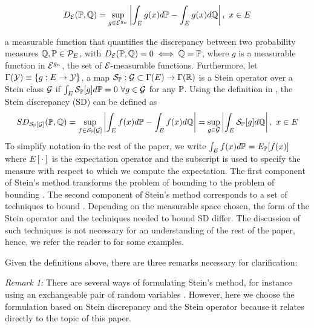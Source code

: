 \begin{equation}\label{IPM}
D_{\mathcal{E}}(\mathbb{P}, \mathbb{Q}) = \sup_{g \in \mathcal{E}^{g_n}}\left|\int_E g(x)d\mathbb{P} - \int_E g(x)d\mathbb{Q}\right|, \ x \in E
\end{equation}

a measurable function that quantifies the discrepancy between two probability measures $\mathbb{Q},\mathbb{P} \in \mathcal{P}_{E}$, with $D_{\mathcal{E}}(\mathbb{P}, \mathbb{Q}) = 0 \iff \mathbb{Q}= \mathbb{P}$, where $g$ is a measurable function in $\mathcal{E}^{g_n}$, the set of $\mathcal{E}$-measurable functions. Furthermore, let $\Gamma(\mathcal{Y}) \equiv \{g: E \rightarrow \mathcal{Y} \}$, a map $\mathcal{S}_{\mathbb{P}}: \mathcal{G} \subset \Gamma(E) \rightarrow \Gamma(\mathbb{R})$ is a Stein operator over a Stein class $\mathcal{G}$ if $\int_E \mathcal{S}_{\mathbb{P}}[g]d\mathbb{P} = 0 \ \forall g \in \mathcal{G}$ for any $\mathbb{P}$. Using the definition in , the Stein discrepancy (SD) can be defined as 
\begin{equation}\label{stein_discrepancy}
SD_{\mathcal{S}_{\mathbb{P}}[\mathcal{G}]}(\mathbb{P},\mathbb{Q}) = \sup_{f \in \mathcal{S}_{\mathbb{P}}[\mathcal{G}]} \left|\int_E f(x)d\mathbb{P} - \int_E f(x)d\mathbb{Q} \right| = \sup_{g \in \mathcal{G}}\left|\int_E \mathcal{S}_{\mathbb{P}}[g]d\mathbb{Q} \right|, \ x \in E
\end{equation}
To simplify notation in the rest of the paper, we write $\int_E f(x)d\mathbb{P} = E_{\mathbb{P}}[f(x)]$ where $E[\cdot]$ is the expectation operator and the subscript is used to specify the measure with respect to which we compute the expectation. 
The first component of Stein's method transforms the problem of bounding  to the problem of bounding . The second component of Stein's method corresponds to a set of techniques to bound . Depending on the measurable space chosen, the form of the Stein operator and the techniques needed to bound SD differ. The discussion of such techniques is not necessary for an understanding of the rest of the paper, hence, we refer the reader to \cite{ross2011fundamentals} for some examples. 

Given the definitions above, there are three remarks necessary for clarification:

\emph{Remark 1:} There are several ways of formulating Stein's method, for instance using an exchangeable pair of random variables \cite{stein1986approximate}. However, here we choose the formulation based on Stein discrepancy and the Stein operator because it relates directly to the topic of this paper.

